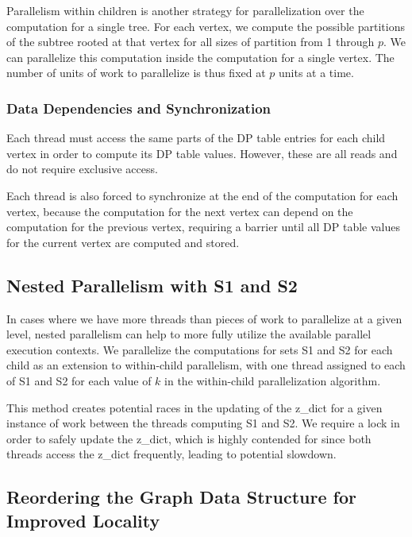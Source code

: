 \documentclass[11pt]{article}
\begin{document}
Parallelism within children is another strategy for parallelization over the computation for a single tree.
For each vertex, we compute the possible partitions of the subtree rooted at that vertex for all sizes of partition from 1 through $p$.
We can parallelize this computation inside the computation for a single vertex.
The number of units of work to parallelize is thus fixed at $p$ units at a time.

\subsubsection{Data Dependencies and Synchronization}

Each thread must access the same parts of the DP table entries for each child vertex in order to compute its DP table values.
However, these are all reads and do not require exclusive access.

Each thread is also forced to synchronize at the end of the computation for each vertex, because the computation for the next vertex can depend on the computation for the previous vertex, requiring a barrier until all DP table values for the current vertex are computed and stored.

\subsection{Nested Parallelism with S1 and S2}
\label{sec:nested}

In cases where we have more threads than pieces of work to parallelize at a given level, nested parallelism can help to more fully utilize the available parallel execution contexts.
We parallelize the computations for sets S1 and S2 for each child as an extension to within-child parallelism, with one thread assigned to each of S1 and S2 for each value of $k$ in the within-child parallelization algorithm.

This method creates potential races in the updating of the z\_dict for a given instance of work between the threads computing S1 and S2.
We require a lock in order to safely update the z\_dict, which is highly contended for since both threads access the z\_dict frequently, leading to potential slowdown.

\subsection{Reordering the Graph Data Structure for Improved Locality}
\label{sec:reordering}
\end{document}
